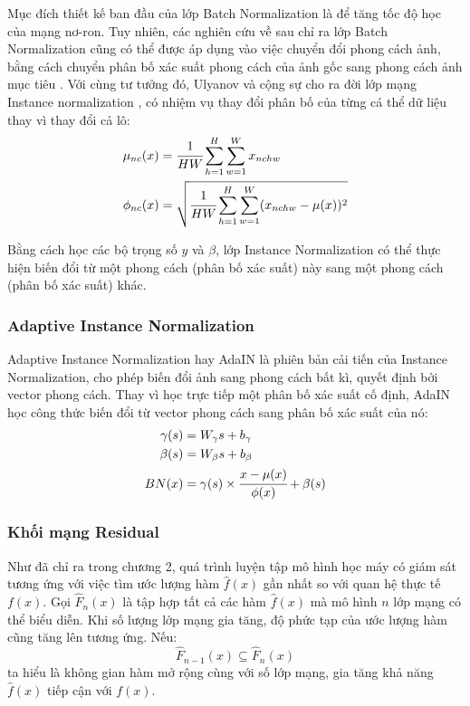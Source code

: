 \documentclass[12pt]{extreport}
\begin{document}
Mục đích thiết kế ban đầu của lớp Batch Normalization là để tăng tốc độ học của mạng nơ-ron. Tuy nhiên, các nghiên cứu về sau chỉ ra lớp Batch Normalization cũng có thể được áp dụng vào việc chuyển đổi phong cách ảnh, bằng cách chuyển phân bố xác suất phong cách của ảnh gốc sang phong cách ảnh mục tiêu \cite{radford2015unsupervised}. Với cùng tư tưởng đó, Ulyanov và cộng sự cho ra đời lớp mạng Instance normalization \cite{DBLP:journals/corr/UlyanovVL16}, có nhiệm vụ thay đổi phân bố của từng cá thể dữ liệu thay vì thay đổi cả lô:
\begin{align*}
    \mu_{nc}(x)  & = \cfrac{1}{HW} \sum_{h = 1}^{H} \sum_{w = 1}^{W} x_{nchw}                     \\
    \phi_{nc}(x) & = \sqrt{\cfrac{1}{HW} \sum_{h = 1}^{H} \sum_{w = 1}^{W} (x_{nchw} - \mu(x))^2}
\end{align*}

Bằng cách học các bộ trọng số $ y $ và $ \beta $, lớp Instance Normalization có thể thực hiện biến đổi từ một phong cách (phân bố xác suất) này sang một phong cách (phân bố xác suất) khác.

\subsubsection{Adaptive Instance Normalization}

Adaptive Instance Normalization hay AdaIN là phiên bản cải tiến của Instance Normalization, cho phép biến đổi ảnh sang phong cách bất kì, quyết định bởi vector phong cách. Thay vì học trực tiếp một phân bố xác suất cố định, AdaIN học công thức biến đổi từ vector phong cách sang phân bố xác suất của nó:
\begin{align*}
    \gamma(s) & = W_{\gamma}s + b_{\gamma}                                \\
    \beta(s)  & = W_{\beta}s + b_{\beta}                                  \\
    BN(x)     & = \gamma(s) \times \cfrac{x - \mu(x)}{\phi(x)} + \beta(s)
\end{align*}

\subsubsection{Khối mạng Residual}

Như đã chỉ ra trong chương 2, quá trình luyện tập mô hình học máy có giám sát tương ứng với việc tìm ước lượng hàm $ \hat{f}(x) $ gần nhất so với quan hệ thực tế $ f(x) $. Gọi $ \hat{F}_n(x) $ là tập hợp tất cả các hàm $ \hat{f}(x) $ mà mô hình $ n $ lớp mạng có thể biểu diễn. Khi số lượng lớp mạng gia tăng, độ phức tạp của ước lượng hàm cũng tăng lên tương ứng. Nếu:
\begin{equation}
    \hat{F}_{n-1}(x) \subseteq \hat{F}_n(x)
    \label{eq:res}
\end{equation}
ta hiểu là không gian hàm mở rộng cùng với số lớp mạng, gia tăng khả năng $ \hat{f}(x) $ tiếp cận với $ f(x) $.
\end{document}
